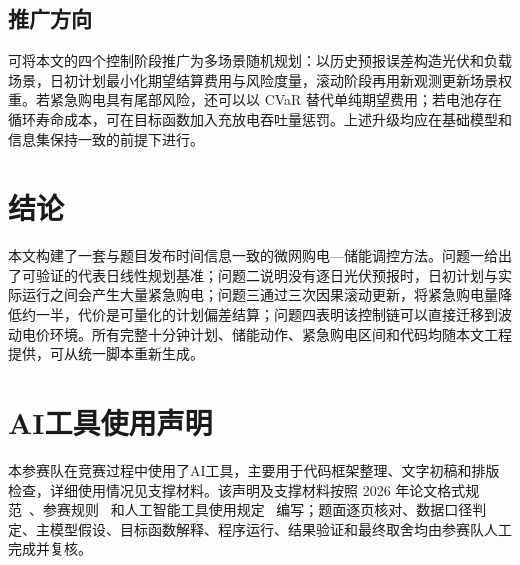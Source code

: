 \documentclass[withoutpreface]{cumcmthesis}
\begin{document}
\subsection{推广方向}
可将本文的四个控制阶段推广为多场景随机规划：以历史预报误差构造光伏和负载场景，日初计划最小化期望结算费用与风险度量，滚动阶段再用新观测更新场景权重。若紧急购电具有尾部风险，还可以以 CVaR 替代单纯期望费用；若电池存在循环寿命成本，可在目标函数加入充放电吞吐量惩罚。上述升级均应在基础模型和信息集保持一致的前提下进行。

\section*{结论}
本文构建了一套与题目发布时间信息一致的微网购电—储能调控方法。问题一给出了可验证的代表日线性规划基准；问题二说明没有逐日光伏预报时，日初计划与实际运行之间会产生大量紧急购电；问题三通过三次因果滚动更新，将紧急购电量降低约一半，代价是可量化的计划偏差结算；问题四表明该控制链可以直接迁移到波动电价环境。所有完整十分钟计划、储能动作、紧急购电区间和代码均随本文工程提供，可从统一脚本重新生成。

\section*{AI工具使用声明}
本参赛队在竞赛过程中使用了AI工具，主要用于代码框架整理、文字初稿和排版检查，详细使用情况见支撑材料。该声明及支撑材料按照 2026 年论文格式规范~\cite{cumcm2026format}、参赛规则~\cite{cumcm2026rule} 和人工智能工具使用规定~\cite{cumcm2026ai} 编写；题面逐页核对、数据口径判定、主模型假设、目标函数解释、程序运行、结果验证和最终取舍均由参赛队人工完成并复核。
\end{document}
